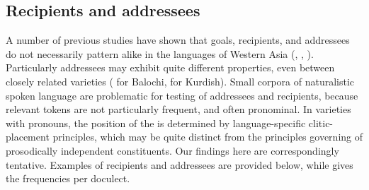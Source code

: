 \documentclass[output=paper,colorlinks,citecolor=brown,draftmode]{langscibook}
\begin{document}
\subsection{Recipients and addressees}\label{balochi:ss:4.4}

A number of previous studies have shown that goals, recipients, and addressees do not necessarily pattern alike in the  languages of Western Asia (, \citealt{Korn2022Targets}, \citealt{stilo_preverbal_2018}). Particularly addressees may exhibit quite different  properties, even between closely related varieties (\citealt{Jahani2018Post-verbal} for Balochi, \citealt{haig_kurdish_2022} for Kurdish). Small corpora of naturalistic spoken language are problematic for testing  of addressees and recipients, because relevant tokens are not particularly frequent, and often pronominal. In varieties with  pronouns, the position of the  is determined by language-specific clitic-placement principles, which may be quite distinct from the principles governing  of prosodically independent constituents. Our findings here are correspondingly tentative. Examples of recipients and addressees are provided below, while  gives the frequencies per doculect.
\end{document}
